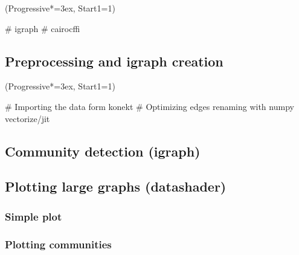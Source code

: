 \documentclass[12pt, a4paper]{article}
\let\OldEasylist\easylist
\let\OldEndEasylist\endeasylist
\renewenvironment{easylist}{%
    \OldEasylist%
    \ListProperties(Progressive*=3ex, Start1=1)%
}{%
    \OldEndEasylist%
}%
\begin{document}
\begin{easylist}
  # igraph
  # cairocffi
\end{easylist}

\newpage
\subsection{Preprocessing and igraph creation}
\begin{easylist}
# Importing the data form konekt
# Optimizing edges renaming with numpy vectorize/jit
\end{easylist}

\newpage
\subsection{Community detection (igraph)}

\newpage
\subsection{Plotting large graphs (datashader)}
\subsubsection{Simple plot}

\subsubsection{Plotting communities}
\end{document}
